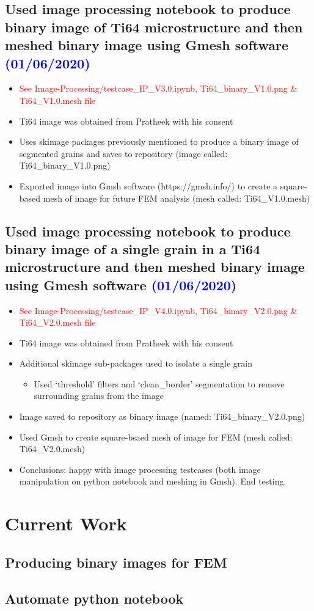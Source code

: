 \documentclass{article}
\begin{document}
\subsection{Used image processing notebook to produce binary image of Ti64 microstructure and then meshed binary image using Gmesh software \textcolor{blue}{(01/06/2020)}}

\begin{itemize}
\item \textcolor{red}{See Image-Processing/testcase\_IP\_V3.0.ipynb, Ti64\_binary\_V1.0.png \& Ti64\_V1.0.mesh file}
\item Ti64 image was obtained from Pratheek with his consent
\item Uses skimage packages previously mentioned to produce a binary image of segmented grains and saves to repository (image called: Ti64\_binary\_V1.0.png)
\item Exported image into Gmsh software (https://gmsh.info/) to create a square-based mesh of image for future FEM analysis (mesh called: Ti64\_V1.0.mesh)
\end{itemize}

\subsection{Used image processing notebook to produce binary image of a single grain in a Ti64 microstructure and then meshed binary image using Gmesh software \textcolor{blue}{(01/06/2020)}}

\begin{itemize}
\item \textcolor{red}{See Image-Processing/testcase\_IP\_V4.0.ipynb, Ti64\_binary\_V2.0.png \& Ti64\_V2.0.mesh file}
\item Ti64 image was obtained from Pratheek with his consent
\item Additional skimage sub-packages used to isolate a single grain
\begin{itemize}
\item Used ‘threshold’ filters and ‘clean\_border’ segmentation to remove surrounding grains from the image
\end{itemize}
\item Image saved to repository as binary image (named: Ti64\_binary\_V2.0.png)
\item Used Gmsh to create square-bsaed mesh of image for FEM (mesh called: Ti64\_V2.0.mesh) 
\item Conclusions: happy with image processing testcases (both image manipulation on python notebook and meshing in Gmsh). End testing.
\end{itemize}

\section{Current Work}

\subsection{Producing binary images for FEM}

\subsection{Automate python notebook}
\end{document}
